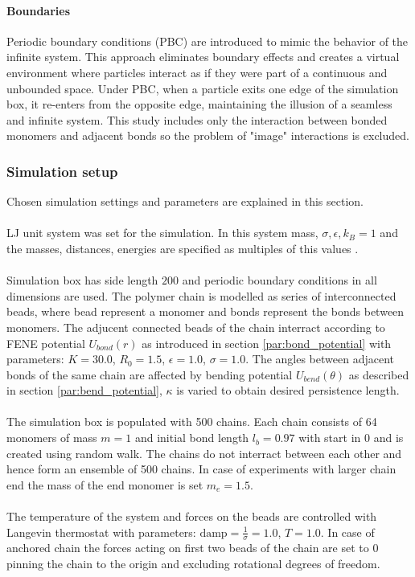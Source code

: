 \documentclass[
    paper=A4,pagesize=automedia,fontsize=12pt,
    BCOR=15mm,DIV=22,
    twoside,headinclude,footinclude=false,
    ngerman,fleqn,             %
    bibliography=totocnumbered,          %
    listof=totoc,                %
    listof=flat,                 %
    cleardoublepage=empty      %
    numbers=endperiod
]{scrartcl}
\begin{document}
\paragraph{Boundaries}
Periodic boundary conditions (PBC) are introduced to mimic the behavior of the infinite system.
This approach eliminates boundary effects and creates a virtual environment where particles 
interact as if they were part of a continuous and unbounded space.
Under PBC, when a particle exits one edge of the simulation box, it re-enters from the opposite edge, 
maintaining the illusion of a seamless and infinite system. This study includes only the interaction
between bonded monomers and adjacent bonds so the problem of "image" interactions is excluded. 


\subsubsection{Simulation setup}
Chosen simulation settings and parameters are explained in this section.
\\
\\
LJ unit system was set for the simulation. In this system 
mass, $\sigma, \epsilon, k_B = 1$ and the masses, distances, energies are specified
as multiples of this values \cite{LAMMPS}.
\\
\\
Simulation box has side length $200$ and periodic boundary conditions in all 
dimensions are used. The polymer chain is modelled as series of interconnected
beads, where bead represent a monomer and bonds represent the bonds between monomers.
The adjucent connected beads of the chain interract according to FENE potential $U_{bond}(r)$
as introduced in section \ref{par:bond_potential} with parameters: 
$K=30.0$, $R_0=1.5$, $\epsilon=1.0$, $\sigma=1.0$.
The angles between adjacent bonds of the same chain are affected by bending potential
$U_{bend}(\theta)$ as described in section \ref{par:bend_potential}, $\kappa$ is varied to obtain
desired persistence length.
\\
\\
The simulation box is populated with 500 chains. Each chain consists of 64 monomers of mass $m=1$
and initial bond length $l_b=0.97$ with start in $0$ and is created using random walk. 
The chains do not interract between each other and hence form
an ensemble of 500 chains. In case of experiments with larger chain end the mass of the end monomer
is set $m_e=1.5$.
\\
\\
The temperature of the system and forces on the beads are controlled with
Langevin thermostat with parameters: $\text{damp}=\frac{1}{\sigma}=1.0$, $T=1.0$. In case of anchored
chain the forces acting on first two beads of the chain are set to 0 pinning the chain to the origin
and excluding rotational degrees of freedom.
\end{document}
